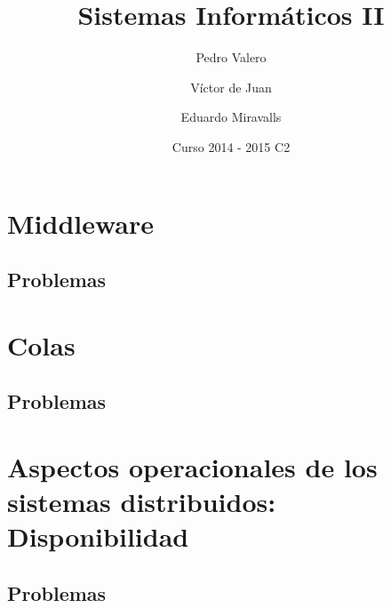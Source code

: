 \documentclass[shortheader, palatino]{apuntes}
\title{Sistemas Informáticos II}
\author{Pedro Valero \and Víctor de Juan \and Eduardo Miravalls}
\date{Curso 2014 - 2015 C2}
\begin{document}
\maketitle

\newpage
\tableofcontents


\chapter{Middleware}

\newpage
\section{Problemas}



\chapter{Colas}

\section{Problemas}



\chapter{Aspectos operacionales de los sistemas distribuidos: Disponibilidad}

\newpage
\section{Problemas}


\printindex
\end{document}
